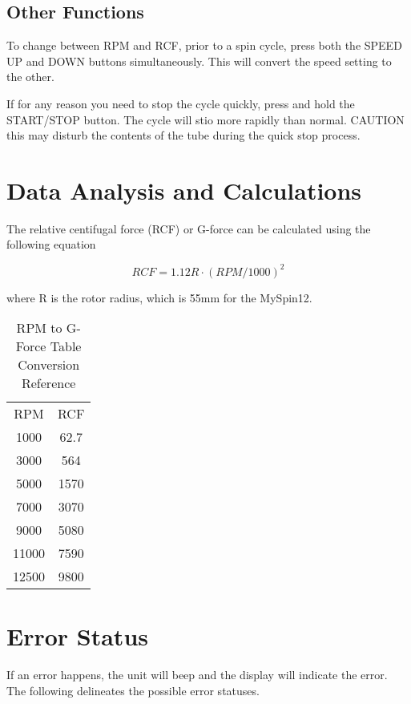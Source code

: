 \documentclass[12pt]{../SOP3_beta}
\begin{document}
\subsection*{Other Functions}

\NP To change between RPM and RCF, prior to a spin cycle, press both the SPEED UP and DOWN buttons simultaneously. This will convert the speed setting to the other.

\NP If for any reason you need to stop the cycle quickly, press and hold the START/STOP button. The cycle will stio more rapidly than normal. CAUTION this may disturb the contents of the tube during the quick stop process.  

\section{Data Analysis and Calculations}

\NP The relative centifugal force (RCF) or G-force can be calculated using the following equation

\begin{equation}
RCF = 1.12 R \cdot (RPM/1000)^2
\end{equation}

\noindent where R is the rotor radius, which is 55mm for the MySpin12.

\begin{table}[h]
\centering
\caption{RPM to G-Force Table Conversion Reference}
\begin{tabular}{cc}
RPM   &   RCF   \\
1000  &   62.7          \\
3000  &   564           \\
5000  &   1570          \\
7000  &   3070          \\
9000  &   5080          \\
11000 &   7590          \\
12500 &   9800          \\
\end{tabular}
\end{table}

\section{Error Status}

\NP If an error happens, the unit will beep and the display will indicate the error. The following delineates the possible error statuses. 
\end{document}
